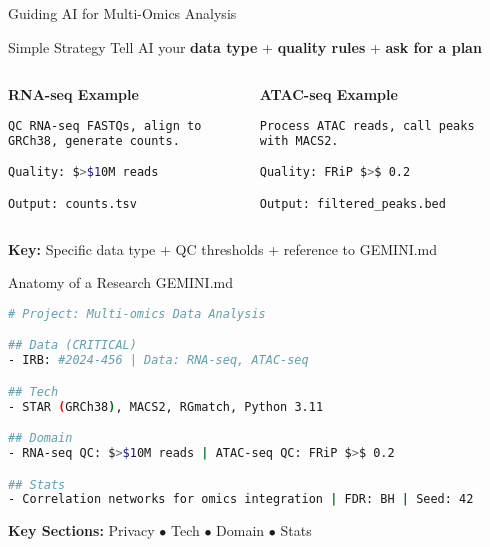 \documentclass[aspectratio=169]{beamer}
\begin{document}
\begin{frame}[fragile]{Guiding AI for Multi-Omics Analysis}
  \begin{block}{Simple Strategy}
    Tell AI your \textbf{data type} + \textbf{quality rules} + \textbf{ask for a plan}
  \end{block}

  \vspace{0.5cm}

  \begin{columns}[T]
    \begin{column}{0.48\textwidth}
      \centering
      \large\bfseries
      \textcolor{conesaTeal}{RNA-seq Example}

      \vspace{0.5cm}
      \normalsize

      \begin{lstlisting}[language=bash, basicstyle=\tiny\ttfamily, frame=single, numbers=none]
QC RNA-seq FASTQs, align to
GRCh38, generate counts.

Quality: $>$10M reads

Output: counts.tsv
      \end{lstlisting}
    \end{column}
    \begin{column}{0.48\textwidth}
      \centering
      \large\bfseries
      \textcolor{conesaOrange}{ATAC-seq Example}

      \vspace{0.5cm}
      \normalsize

      \begin{lstlisting}[language=bash, basicstyle=\tiny\ttfamily, frame=single, numbers=none]
Process ATAC reads, call peaks
with MACS2.

Quality: FRiP $>$ 0.2

Output: filtered_peaks.bed
      \end{lstlisting}
    \end{column}
  \end{columns}

  \vspace{0.5cm}
  \centering
  \footnotesize
  \textbf{Key:} Specific data type + QC thresholds + reference to GEMINI.md
\end{frame}

\begin{frame}[fragile]{Anatomy of a Research GEMINI.md}
  \begin{lstlisting}[language=bash, basicstyle=\small\ttfamily]
# Project: Multi-omics Data Analysis

## Data (CRITICAL)
- IRB: #2024-456 | Data: RNA-seq, ATAC-seq

## Tech
- STAR (GRCh38), MACS2, RGmatch, Python 3.11

## Domain
- RNA-seq QC: $>$10M reads | ATAC-seq QC: FRiP $>$ 0.2

## Stats
- Correlation networks for omics integration | FDR: BH | Seed: 42
  \end{lstlisting}

  \vspace{0.5cm}
  \centering
  \normalsize
  \textbf{Key Sections:} Privacy $\bullet$ Tech $\bullet$ Domain $\bullet$ Stats
\end{frame}
\end{document}
